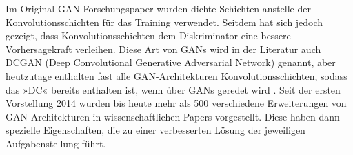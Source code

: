 Im Original-GAN-Forschungspaper wurden dichte Schichten anstelle der Konvolutionsschichten für das Training verwendet. Seitdem hat sich jedoch gezeigt, dass Konvolutionsschichten dem Diskriminator eine bessere Vorhersagekraft verleihen. Diese Art von GANs wird in der Literatur auch DCGAN (Deep Convolutional Generative Adversarial Network) genannt, aber heutzutage enthalten fast alle GAN-Architekturen Konvolutionsschichten, sodass das »DC« bereits enthalten ist, wenn über GANs geredet wird \cite{bro19}. Seit der ersten Vorstellung 2014 wurden bis heute mehr als 500 verschiedene Erweiterungen von GAN-Architekturen in wissenschaftlichen Papers vorgestellt. Diese haben dann spezielle Eigenschaften, die zu einer verbesserten Lösung der jeweiligen Aufgabenstellung führt.
